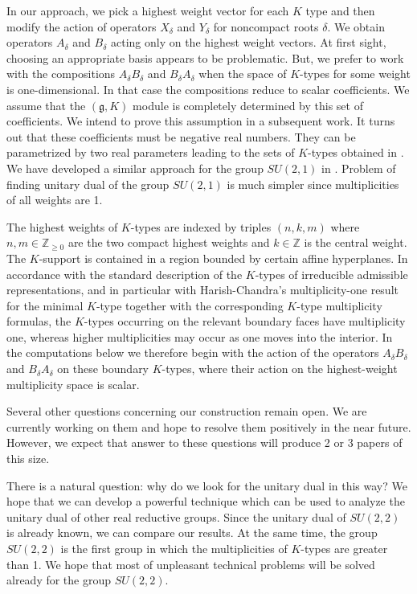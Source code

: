 \documentclass[twoside,a4paper,12pt]{article}
\newcommand{\g}{\ensuremath{\mathfrak g}}
\newcommand{\Z}{\ensuremath{\mathbb Z}}
\theoremstyle{definition}
\begin{document}
In our approach, we pick a highest weight vector for each $K$ type and then
modify the action of operators $X_\delta$ and $Y_\delta$ for noncompact roots
$\delta$. We obtain operators $A_\delta$ and $B_\delta$ acting only on the
highest weight vectors. At first sight, choosing an appropriate basis appears to
be problematic. But, we prefer to work with the compositions $A_\delta B_\delta$
and $B_\delta A_\delta$ when the space of $K$-types for some weight is
one-dimensional. In that case the compositions reduce to scalar coefficients.
We assume that the $(\g,K)$ module is completely determined by this set of
coefficients. We intend to prove this assumption in a subsequent work.
It turns out that these coefficients must be negative real numbers. They can be
parametrized by two real parameters leading to the sets of $K$-types obtained in
\cite{KnappSpeh1982}. 
We have developed a similar approach for the group
$SU(2,1)$ in \cite{kov2021}. Problem of finding unitary dual of the group
$SU(2,1)$ is much simpler since multiplicities of all weights are 1.

The highest weights of $K$-types are indexed by triples $(n,k,m)$ where
$n,m\in\mathbb Z_{\geq0}$ are the two compact highest weights and $k\in\Z$
is the central weight. The $K$-support is contained in a region bounded by
certain affine hyperplanes. In accordance with the standard description of the
$K$-types of irreducible admissible representations, and in particular with
Harish-Chandra's multiplicity-one result for the minimal $K$-type together with
the corresponding $K$-type multiplicity formulas, the $K$-types occurring on the
relevant boundary faces have multiplicity one, whereas higher multiplicities may
occur as one moves into the interior. In the computations below we therefore
begin with the action of the operators $A_\delta B_\delta$ and
$B_\delta A_\delta$ on these boundary $K$-types, where their action on the
highest-weight multiplicity space is scalar.

Several other questions concerning our construction remain open. We are
currently working on them and hope to resolve them positively in the near
future. However, we expect that answer to these questions will produce
2 or 3 papers of this size.

There is a natural question: why do we look for the unitary dual in this way?
We hope that we can develop a powerful technique which can be used to
analyze the unitary dual of other real reductive groups. Since the unitary
dual of $SU(2,2)$ is already known, we can compare our results. At the same
time, the group $SU(2,2)$ is the first group in which the multiplicities of
$K$-types are greater than 1. We hope that most of unpleasant technical
problems will be solved already for the group $SU(2,2)$.
\end{document}
